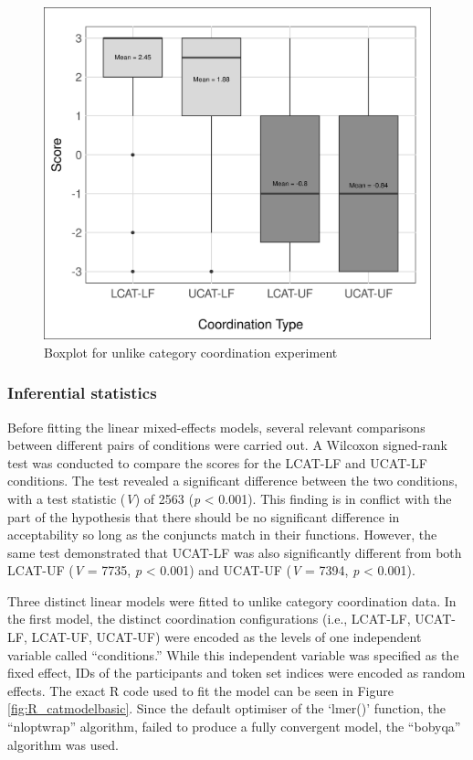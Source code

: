 \begin{figure}[!h]
	\centering
	\includegraphics[width=0.88\linewidth]{images/updated_experiment/catboxplot.png}
	\caption{Boxplot for unlike category coordination experiment}
	\label{fig:catboxplot}
\end{figure}

\subsubsection{Inferential statistics}

Before fitting the linear mixed-effects models, several relevant comparisons between different pairs of conditions were carried out. A Wilcoxon signed-rank test was conducted to compare the scores for the LCAT-LF and UCAT-LF conditions. The test revealed a significant difference between the two conditions, with a test statistic (\textit{V}) of 2563 (\textit{p} < 0.001). This finding is in conflict with the part of the hypothesis that there should be no significant difference in acceptability so long as the conjuncts match in their functions. However, the same test demonstrated that UCAT-LF was also significantly different from both LCAT-UF (\textit{V} = 7735, \textit{p} < 0.001) and UCAT-UF (\textit{V} = 7394, \textit{p} < 0.001). 

Three distinct linear models were fitted to unlike category coordination data. In the first model, the distinct coordination configurations (i.e., LCAT-LF, UCAT-LF, LCAT-UF, UCAT-UF) were encoded as the levels of one independent variable called ``conditions.'' While this independent variable was specified as the fixed effect, IDs of the participants and token set indices were encoded as random effects. The exact R code used to fit the model can be seen in Figure \ref{fig:R_catmodelbasic}. Since the default optimiser of the `lmer()' function, the ``nloptwrap'' algorithm, failed to produce a fully convergent model, the ``bobyqa'' algorithm was used.

